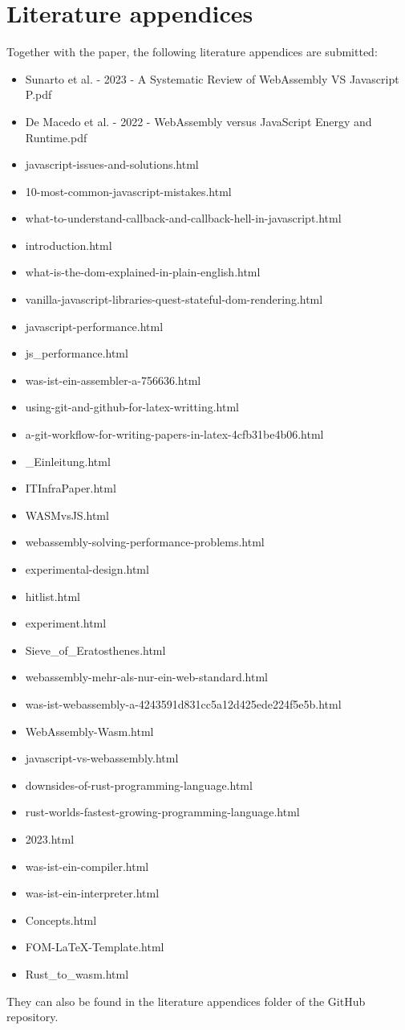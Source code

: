 \section{Literature appendices}
Together with the paper, the following literature appendices are submitted:

\begin{itemize}
    \item Sunarto et al. - 2023 - A Systematic Review of WebAssembly VS Javascript P.pdf
    \item De Macedo et al. - 2022 - WebAssembly versus JavaScript Energy and Runtime.pdf
    \item javascript-issues-and-solutions.html
    \item 10-most-common-javascript-mistakes.html
    \item what-to-understand-callback-and-callback-hell-in-javascript.html
    \item introduction.html
    \item what-is-the-dom-explained-in-plain-english.html
    \item vanilla-javascript-libraries-quest-stateful-dom-rendering.html
    \item javascript-performance.html
    \item js_performance.html
    \item was-ist-ein-assembler-a-756636.html
    \item using-git-and-github-for-latex-writting.html
    \item a-git-workflow-for-writing-papers-in-latex-4cfb31be4b06.html
    \item _Einleitung.html
    \item ITInfraPaper.html
    \item WASMvsJS.html
    \item webassembly-solving-performance-problems.html
    \item experimental-design.html
    \item hitlist.html
    \item experiment.html
    \item Sieve_of_Eratosthenes.html
    \item webassembly-mehr-als-nur-ein-web-standard.html
    \item was-ist-webassembly-a-4243591d831cc5a12d425ede224f5e5b.html
    \item WebAssembly-Wasm.html
    \item javascript-vs-webassembly.html
    \item downsides-of-rust-programming-language.html
    \item rust-worlds-fastest-growing-programming-language.html
    \item 2023.html
    \item was-ist-ein-compiler.html
    \item was-ist-ein-interpreter.html
    \item Concepts.html
    \item FOM-LaTeX-Template.html
    \item Rust_to_wasm.html
\end{itemize}
They can also be found in the literature appendices folder of the GitHub repository.

